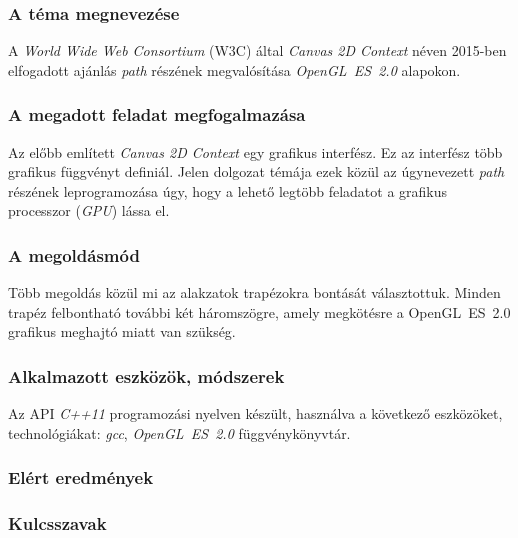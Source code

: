 \documentclass[12pt]{report}
\theoremstyle{definition}
\begin{document}

    \subsubsection*{A téma megnevezése}

A \emph{World Wide Web Consortium} (W3C) által \emph{Canvas 2D Context} néven
2015-ben elfogadott ajánlás \emph{path} részének megvalósítása
\emph{OpenGL~ES~2.0} alapokon.

    \subsubsection*{A megadott feladat megfogalmazása}

Az előbb említett \emph{Canvas 2D Context} egy grafikus interfész. Ez az
interfész több grafikus függvényt definiál. Jelen dolgozat témája ezek közül az
úgynevezett \emph{path} részének leprogramozása úgy, hogy a lehető legtöbb
feladatot a grafikus processzor (\textit{GPU}) lássa el.

    \subsubsection*{A megoldásmód}

Több megoldás közül mi az alakzatok trapézokra bontását választottuk. Minden
trapéz felbontható további két háromszögre, amely megkötésre a OpenGL~ES~2.0
grafikus meghajtó miatt van szükség.

    \subsubsection*{Alkalmazott eszközök, módszerek}

Az API \emph{C++11} programozási nyelven készült, használva a következő
eszközöket, technológiákat: \emph{gcc}, \textit{OpenGL~ES~2.0} függvénykönyvtár.

    \subsubsection*{Elért eredmények}

    \subsubsection*{Kulcsszavak}
\end{document}

